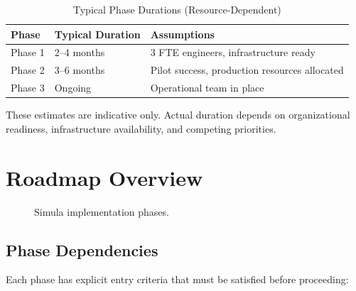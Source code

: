 \documentclass[12pt,a4paper,twoside]{report}
\begin{document}
\begin{table}[htbp]
\centering
\caption{Typical Phase Durations (Resource-Dependent)}
\label{tab:typical-durations}
\footnotesize
\begin{tabular}{@{}l l l@{}}
\toprule
\textbf{Phase} & \textbf{Typical Duration} & \textbf{Assumptions} \\
\midrule
Phase 1 & 2--4 months & 3 FTE engineers, infrastructure ready \\
Phase 2 & 3--6 months & Pilot success, production resources allocated \\
Phase 3 & Ongoing & Operational team in place \\
\bottomrule
\end{tabular}
\end{table}

\noindent
These estimates are indicative only. Actual duration depends on organizational
readiness, infrastructure availability, and competing priorities.

\section{Roadmap Overview}

\begin{figure}[htbp]
\centering
{}
\caption{Simula implementation phases.}
\label{fig:phases}
\end{figure}

\subsection{Phase Dependencies}

Each phase has explicit entry criteria that must be satisfied before proceeding:
\end{document}
